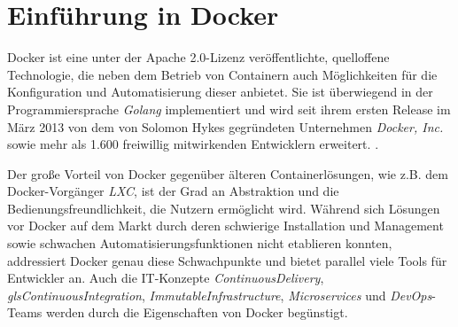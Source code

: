 \documentclass[../main.tex]{subfiles}
\begin{document}


  \section{Einführung in Docker}
  \label{dockerIntro}
    Docker ist eine unter der Apache 2.0-Lizenz veröffentlichte, quelloffene Technologie, die neben dem Betrieb von Containern auch Möglichkeiten für die Konfiguration und Automatisierung dieser anbietet. Sie ist überwiegend in der Programmiersprache \emph{Golang} implementiert und wird seit ihrem ersten Release im März 2013 von dem von Solomon Hykes gegründeten Unternehmen \emph{Docker, Inc.}\cite{dockerHykes} sowie mehr als 1.600 freiwillig mitwirkenden Entwicklern erweitert. \cite{githubDocker}\cite[S.7]{dockerBook}\cite{githubDockerChangelog}\cite{dockerCompany}.




    Der große Vorteil von Docker gegenüber älteren Containerlösungen, wie z.B. dem Docker-Vorgänger \emph{LXC}, ist der Grad an Abstraktion und die Bedienungsfreundlichkeit, die Nutzern ermöglicht wird. Während sich Lösungen vor Docker auf dem Markt durch deren schwierige Installation und Management sowie schwachen Automatisierungsfunktionen nicht etablieren konnten, addressiert Docker genau diese Schwachpunkte \cite[S.7]{dockerBook} und bietet parallel viele Tools für Entwickler an. Auch die IT-Konzepte \emph{\gls{ContinuousDelivery}}, \emph{gls{ContinuousIntegration}}, \emph{\gls{ImmutableInfrastructure}}, \emph{\glspl{Microservice}} und \emph{\gls{DevOps}}-Teams werden durch die Eigenschaften von Docker begünstigt.
\end{document}
